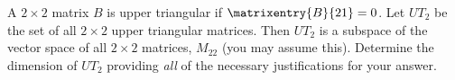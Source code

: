 A $2\times 2$ matrix $B$ is upper triangular if $\matrixentry{B}{21}=0$.  Let $UT_2$ be the set of all $2\times 2$ upper triangular matrices.  Then $UT_2$ is a subspace of the vector space of all $2\times 2$ matrices, $M_{22}$ (you may assume this).  Determine the dimension of $UT_2$ providing {\em all} of the necessary justifications for your answer.